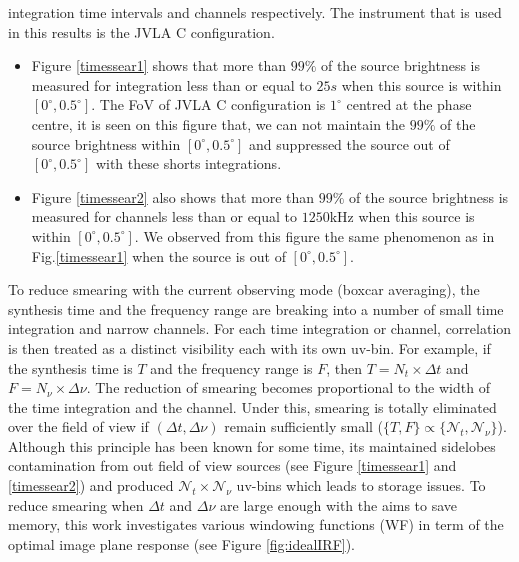 \documentclass[useAMS,usenatbib]{mn2e}
\begin{document}
integration time intervals and channels respectively. The instrument that is used in this results is the JVLA C configuration.
\begin{itemize}
 \item Figure \ref{timessear1} shows that more than $99\%$ of the source brightness is measured for integration less than or equal to $25s$ 
when this source is within $[0^\circ,0.5^\circ]$. The FoV of JVLA C configuration is $1^\circ$ centred at the phase centre, it is seen on 
this figure that, we can not maintain the $99\%$ of the source brightness within $[0^\circ,0.5^\circ]$ and suppressed the source out of 
$[0^\circ,0.5^\circ]$ with these shorts integrations.
  \item Figure \ref{timessear2} also shows that more than $99\%$ of the source brightness is measured for channels less than or equal to 
$1250$kHz when this source is within 
$[0^\circ,0.5^\circ]$. We observed from this figure the same phenomenon as in Fig.\ref{timessear1} when the source is out of
$[0^\circ,0.5^\circ]$.
\end{itemize}
To reduce smearing with the current observing mode (boxcar averaging), the synthesis time and the frequency range are breaking into a 
number of small time 
integration and narrow channels. For each time integration or channel, correlation  is then treated as a distinct visibility each with its 
own uv-bin.
For example, if the synthesis time is $T$ and the frequency range is $F$, then $T = N_t \times \Delta t$
and $F = N_{\nu}\times \Delta \nu$. The reduction of smearing becomes proportional to the width of the time integration and the channel. 
Under this, smearing is totally eliminated over the field of view if $(\Delta t, \Delta \nu)$ remain sufficiently small ($\{ T, F\} \propto 
\{\mathcal{N}_t, \mathcal{N}_{\nu}\}$). Although this principle has been known for some time, its  maintained sidelobes contamination from 
out field of view sources (see Figure \ref{timessear1} and \ref{timessear2}) and produced $\mathcal{N}_t\times\mathcal{N}_{\nu}$ 
uv-bins 
which leads to storage issues. To reduce smearing when 
$\Delta t$ and  $\Delta \nu$ are large enough with the aims to save memory, this work investigates various windowing functions (WF) in term 
of the 
optimal image plane response (see Figure \ref{fig:idealIRF}). 
\end{document}
